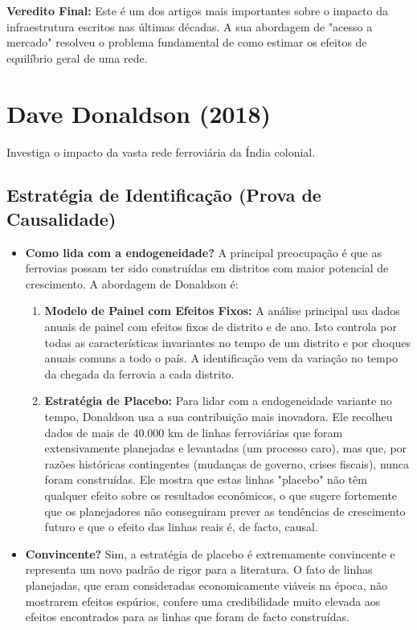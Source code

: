 \documentclass[12pt, a4paper]{article}
\begin{document}
\noindent\textbf{Veredito Final:} Este é um dos artigos mais importantes sobre o impacto da infraestrutura escritos nas últimas décadas. A sua abordagem de "acesso a mercado" resolveu o problema fundamental de como estimar os efeitos de equilíbrio geral de uma rede. 

\section{Dave Donaldson (2018)}
Investiga o impacto da vasta rede ferroviária da Índia colonial.

\subsection{Estratégia de Identificação (Prova de Causalidade)}

\begin{itemize}
    \item \textbf{Como lida com a endogeneidade?} A principal preocupação é que as ferrovias possam ter sido construídas em distritos com maior potencial de crescimento. A abordagem de Donaldson é:
        \begin{enumerate}
            \item \textbf{Modelo de Painel com Efeitos Fixos:} A análise principal usa dados anuais de painel com efeitos fixos de distrito e de ano. Isto controla por todas as características invariantes no tempo de um distrito e por choques anuais comuns a todo o país. A identificação vem da variação no tempo da chegada da ferrovia a cada distrito.
            \item \textbf{Estratégia de Placebo:} Para lidar com a endogeneidade variante no tempo, Donaldson usa a sua contribuição mais inovadora. Ele recolheu dados de mais de 40.000 km de linhas ferroviárias que foram extensivamente planejadas e levantadas (um processo caro), mas que, por razões históricas contingentes (mudanças de governo, crises fiscais), nunca foram construídas. Ele mostra que estas linhas "placebo" não têm qualquer efeito sobre os resultados econômicos, o que sugere fortemente que os planejadores não conseguiram prever as tendências de crescimento futuro e que o efeito das linhas reais é, de facto, causal.
        \end{enumerate}
    \item \textbf{Convincente?} Sim, a estratégia de placebo é extremamente convincente e representa um novo padrão de rigor para a literatura. O fato de linhas planejadas, que eram consideradas economicamente viáveis na época, não mostrarem efeitos espúrios, confere uma credibilidade muito elevada aos efeitos encontrados para as linhas que foram de facto construídas.
\end{itemize}
\end{document}
